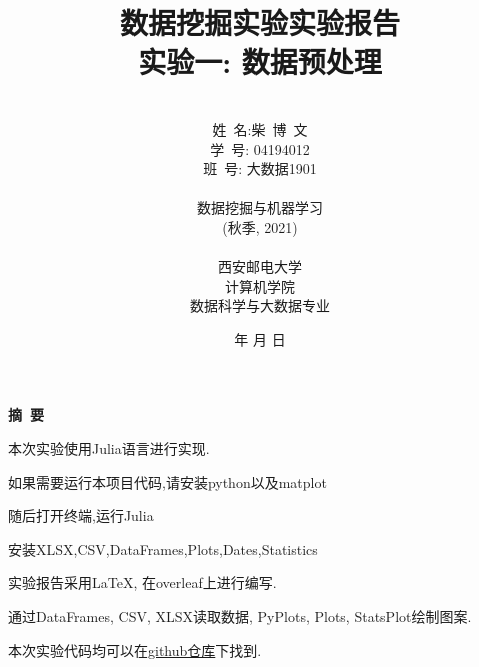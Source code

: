 \documentclass[a4paper]{article}
\begin{document}
\renewcommand{\contentsname}{目\ 录}
\renewcommand{\appendixname}{附录}
\renewcommand{\appendixpagename}{附录}
\renewcommand{\refname}{参考文献} 
\renewcommand{\figurename}{图}
\renewcommand{\tablename}{表}
\renewcommand{\today}{\number\year 年 \number\month 月 \number\day 日}

\title{{\Huge 数据挖掘实验实验报告{\large\linebreak\\}}{\Large 实验一: 数据预处理\linebreak\linebreak}}
\author{\\姓\ 名:柴\ 博\ 文\\ 
学\ 号: 04194012\\
班\ 号: 大数据1901\\\\
数据挖掘与机器学习\\
(秋季, 2021)\\\\
西安邮电大学\\
计算机学院\\
数据科学与大数据专业}
\date{\today}
\maketitle
\newpage

\begin{center}
{\Large\bf{摘\ 要\\}}
\end{center}
本次实验使用Julia语言进行实现.

如果需要运行本项目代码,请安装python以及matplot

随后打开终端,运行Julia

安装XLSX,CSV,DataFrames,Plots,Dates,Statistics

实验报告采用LaTeX, 在overleaf上进行编写.

通过DataFrames, CSV, XLSX读取数据, PyPlots, Plots, StatsPlot绘制图案.

本次实验代码均可以在\href{https://github.com/lovebaihezi/lab/tree/main/data-process/lab1/julia}{github仓库}下找到.

\newpage
\begin{center}
\tableofcontents\label{c}
\end{center}
\newpage
\end{document}

